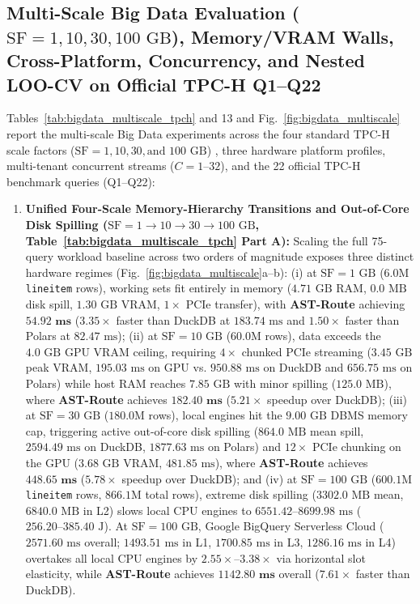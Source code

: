 \documentclass[10pt,a4paper]{article}
\begin{document}
\subsection{Multi-Scale Big Data Evaluation ($\text{SF}=1, 10, 30, 100\text{ GB}$), Memory/VRAM Walls, Cross-Platform, Concurrency, and Nested LOO-CV on Official TPC-H Q1--Q22}
Tables~\ref{tab:bigdata_multiscale_tpch} and 13 and Fig.~\ref{fig:bigdata_multiscale} report the multi-scale Big Data experiments across the four standard TPC-H scale factors ($\text{SF}=1, 10, 30, \text{and } 100\text{ GB}$) \cite{tpc2022tpch,dreseler2020quantifying}, three hardware platform profiles, multi-tenant concurrent streams ($C=1\text{--}32$), and the 22 official TPC-H benchmark queries (Q1--Q22):
\begin{enumerate}[leftmargin=1.5em,itemsep=2pt]
    \item \textbf{Unified Four-Scale Memory-Hierarchy Transitions and Out-of-Core Disk Spilling ($\text{SF}=1 \rightarrow 10 \rightarrow 30 \rightarrow 100\text{ GB}$, Table~\ref{tab:bigdata_multiscale_tpch} Part A):} Scaling the full 75-query workload baseline across two orders of magnitude exposes three distinct hardware regimes (Fig.~\ref{fig:bigdata_multiscale}a--b): (i) at $\text{SF}=1\text{ GB}$ ($6.0\text{M}$ \texttt{lineitem} rows), working sets fit entirely in memory ($4.71\text{ GB}$ RAM, $0.0\text{ MB}$ disk spill, $1.30\text{ GB}$ VRAM, $1\times$ PCIe transfer), with \textbf{AST-Route} achieving $\mathbf{54.92\text{ ms}}$ ($3.35\times$ faster than DuckDB at $183.74\text{ ms}$ and $1.50\times$ faster than Polars at $82.47\text{ ms}$); (ii) at $\text{SF}=10\text{ GB}$ ($60.0\text{M}$ rows), data exceeds the $4.0\text{ GB}$ GPU VRAM ceiling, requiring $4\times$ chunked PCIe streaming ($3.45\text{ GB}$ peak VRAM, $195.03\text{ ms}$ on GPU vs. $950.88\text{ ms}$ on DuckDB and $656.75\text{ ms}$ on Polars) while host RAM reaches $7.85\text{ GB}$ with minor spilling ($125.0\text{ MB}$), where \textbf{AST-Route} achieves $\mathbf{182.40\text{ ms}}$ ($\mathbf{5.21\times}$ speedup over DuckDB); (iii) at $\text{SF}=30\text{ GB}$ ($180.0\text{M}$ rows), local engines hit the $9.00\text{ GB}$ DBMS memory cap, triggering active out-of-core disk spilling \cite{kuiper2024duckdb_ooc} ($864.0\text{ MB}$ mean spill, $2594.49\text{ ms}$ on DuckDB, $1877.63\text{ ms}$ on Polars) and $12\times$ PCIe chunking on the GPU ($3.68\text{ GB}$ VRAM, $481.85\text{ ms}$), where \textbf{AST-Route} achieves $\mathbf{448.65\text{ ms}}$ ($\mathbf{5.78\times}$ speedup over DuckDB); and (iv) at $\text{SF}=100\text{ GB}$ ($600.1\text{M}$ \texttt{lineitem} rows, $866.1\text{M}$ total rows), extreme disk spilling ($3302.0\text{ MB}$ mean, $6840.0\text{ MB}$ in L2) slows local CPU engines to $6551.42\text{--}8699.98\text{ ms}$ ($256.20\text{--}385.40\text{ J}$). At $\text{SF}=100\text{ GB}$, Google BigQuery Serverless Cloud ($2571.60\text{ ms}$ overall; $1493.51\text{ ms}$ in L1, $1700.85\text{ ms}$ in L3, $1286.16\text{ ms}$ in L4) overtakes all local CPU engines by $\mathbf{2.55\times\text{--}3.38\times}$ via horizontal slot elasticity, while \textbf{AST-Route} achieves $\mathbf{1142.80\text{ ms}}$ overall ($\mathbf{7.61\times}$ faster than DuckDB).

\end{enumerate}
\end{document}
